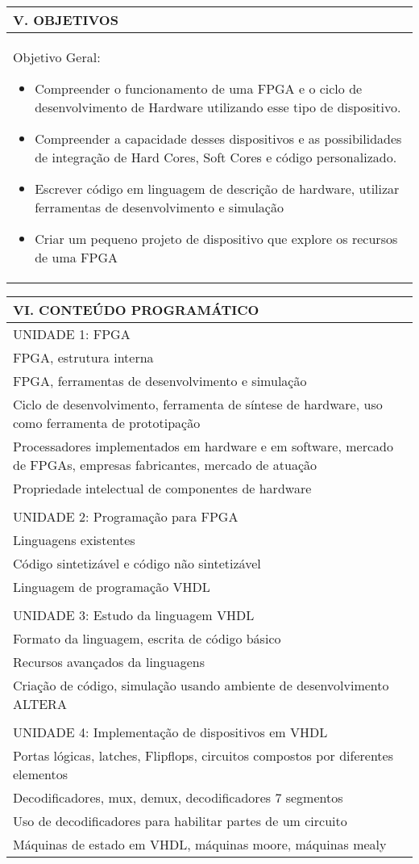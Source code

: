 \documentclass[12pt]{article}
\begin{document}
\begin{longtable}{|L{1.025\textwidth}|} \hline
%
{\bf V. OBJETIVOS } \\ \hline
Objetivo Geral: 
\begin{itemize}
\item Compreender o funcionamento de uma FPGA e o ciclo de desenvolvimento de Hardware utilizando esse tipo de dispositivo. 
\item Compreender a capacidade desses dispositivos e as possibilidades de integração de Hard Cores, Soft Cores e código personalizado.
\item Escrever código em linguagem de descrição de hardware, utilizar ferramentas de desenvolvimento e simulação
\item Criar um pequeno projeto de dispositivo que explore os recursos de uma FPGA
\end{itemize}
\\ \hline
\end{longtable}


\begin{longtable}{|L{1.025\textwidth}|} \hline
%
{\bf VI. CONTEÚDO PROGRAMÁTICO } \\ \hline
UNIDADE 1: FPGA\\
FPGA, estrutura interna\\
FPGA, ferramentas de desenvolvimento e simulação\\
Ciclo de desenvolvimento, ferramenta de síntese de hardware, uso como ferramenta de prototipação\\
Processadores implementados em hardware e em software, mercado de FPGAs, empresas fabricantes, mercado de atuação \\
Propriedade intelectual de componentes de hardware\\
\\
UNIDADE 2: Programação para FPGA \\
Linguagens existentes\\
Código sintetizável e código não sintetizável\\
Linguagem de programação VHDL\\
\\
UNIDADE 3: Estudo da linguagem VHDL \\
Formato da linguagem, escrita de código básico\\
Recursos avançados da linguagens\\
Criação de código, simulação usando ambiente de desenvolvimento ALTERA\\
\\
UNIDADE 4: Implementação de dispositivos em VHDL \\
Portas lógicas, latches, Flipflops, circuitos compostos por diferentes elementos\\
Decodificadores, mux, demux, decodificadores 7 segmentos\\
Uso de decodificadores para habilitar partes de um circuito\\
Máquinas de estado em VHDL, máquinas moore, máquinas mealy
\\ \hline
\end{longtable} 
\end{document}
